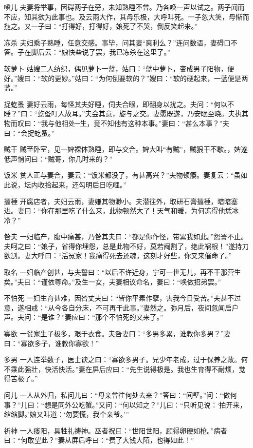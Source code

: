 \documentclass[12pt,UTF8]{ctexbook}
\begin{document}
嗔儿
夫妻将举事，因碍两子在旁，未知熟睡不曾。乃各唤一声以试之。两子闻而不应，知其欲为此事也。及云雨大作，其母乐极，大呼叫死。一子忽大笑，母惭而挞之。又一子曰：“打得好，打得好，娘死了不哭，倒反笑起来。”

冻杀
夫妇乘子熟睡，任意交感。事毕，问其妻“爽利么？”连问数语，妻碍口不答。子在脚后云：“娘快些说了罢，我已冻杀在这里了。”

软萝卜
姑嫂二人纺织，偶见萝卜一蓝，姑曰：“蓝中萝卜，变成男子阳物，便好。”嫂曰：“软的更妙。”姑曰：“为何倒要软的？”嫂曰：“软的硬起来，一蓝便是两蓝。”

捉虼蚤
妻好云雨，每怪其夫好睡，伺夫合眼，即翻身以扰之。夫问：“何以不睡？”曰：“虼蚤叮人故耳。”夫会其意，旋与之交。妻愿既遂，乃安眠至晓。夫执其物而叹曰：“我与他相处─生，竟不知他有这种本事。”妻曰：“甚么本事？”夫曰：“会捉虼蚤。”

贼干
贼至卧室，见一婢裸体熟睡，即与交合。婢大叫“有贼”，贼狠干不歇。，婢遂低声悄问曰：“贼哥，你几时来的？”

饭米
贫人正与妻合，妻云：“饭米都没了，有甚高兴？”夫物顿痿。妻复云：“虽如此说，坛内收拾起来，还勾明后日吃哩。”

擂棰
开腐店者，夫妇云雨，妻嫌其物渺小。夫潜往外，取研石膏擂棰，暗暗塞进。妻曰：“你在那里吃了什么来，此物顿然大了！天气和暖，为何冻得他恁冰冷？”

咎夫
一妇临产，腹中痛甚，乃咎其夫曰：“都是你作怪，带累我如此。”怨詈不止。夫呵之曰：“娘子，省得你埋怨，总是此物不好，莫若阉割了，绝此祸根！”遂持刀欲割。妻大呼曰：“活冤家！我痛得死去还魂，这刻才好些，你又来催命了。”

取名
一妇临产创甚，与夫誓曰：“以后不许近身，宁可一世无儿，再不干那营生矣。”夫曰：“谨依尊命。”及生一女，夫妻相议命名，妻曰：“唤做招弟罢。”

不怕死
一妇生育甚难，因咎丈夫曰：“皆你平素作孽，害我今日受苦。”夫甚不过意，遂相戒：“从今各自分床，不可再干此事。”妻然之。弥月后，夜间忽闻启户声。夫问：“是谁？”妻应曰：“那个不怕死的又来了。”

寡欲
一贫家生子极多，艰于衣食。夫咎妻曰：“多男多累，谁教你多男？”妻曰：“寡欲多子，谁教你寡欲！”

多男
一人连举数子，医士谀之曰：“寡欲多男子。兄少年老成，过于保养之故。何不乘此强壮，快活快活。”妻在屏后应曰：“先生说得极是。我也生育得不耐烦，觉得苦极了。”

问儿
一人从外归，私问儿曰：“母亲曾往何处去来？”答曰：“间壁。”问：“做何事？”儿曰：“想是同外公吃蟹。”又问：“何以知之？”儿曰：“只听见说：‘拍开来，缩缩脚。’娘又叫道：‘勿要慌，我个亲爷。’”

祈神
一人痿阳，具牲礼祷神。巫者祝曰：“世阳世阳，顾得卵硬如枪。”病者曰：“何敢望此？”妻从屏后呼曰：“费了大钱大陌，也得如此！”
\end{document}
